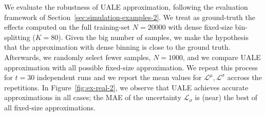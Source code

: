 \documentclass[twoside]{article}
\begin{document}
We evaluate the robustness of UALE approximation, following the
evaluation framework of Section~\ref{sec:simulation-examples-2}. We
treat as ground-truth the effects computed on the full training-set
\(N=20000\) with dense fixed-size bin-splitting (\(K=80\)). Given the
big number of samples, we make the hypothesis that the approximation
with dense binning is close to the ground truth. Afterwards, we
randomly select fewer samples, \(N=1000\), and we compare UALE
approximation with all possible fixed-size approximation. We repeat
this process for \(t=30\) independent runs and we report the mean
values for \(\mathcal{L}^{\mu}, \mathcal{L}^{\sigma}\) accross the
repetitions. In Figure~\ref{fig:ex-real-2}, we observe that UALE
achieves accurate approximations in all cases; the MAE of the
uncertainty \(\mathcal{L}_\sigma\) is (near) the best of all
fixed-size approximations.
\end{document}
